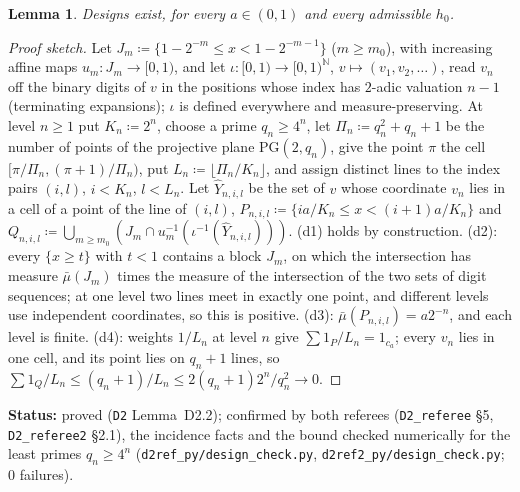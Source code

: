 \documentclass[11pt]{article}
\newtheorem{lemma}[theorem]{Lemma}
\theoremstyle{definition}
\theoremstyle{remark}
\newcommand{\src}[1]{\texttt{#1}}
\newcommand{\status}[1]{\par\smallskip\noindent\textbf{Status:} #1\par\smallskip}
\begin{document}
\begin{lemma}\label{lem:D22}
Designs exist, for every $a\in(0,1)$ and every admissible $h_0$.
\end{lemma}
\begin{proof}[Proof sketch]
Let $J_m\coloneqq\{1-2^{-m}\le x<1-2^{-m-1}\}$ ($m\ge m_0$), with increasing affine maps $u_m:J_m\to[0,1)$, and let $\iota:[0,1)\to[0,1)^{\mathbb N}$, $v\mapsto(v_1,v_2,\dots)$, read $v_n$ off the binary digits of $v$ in the positions whose index has $2$-adic valuation $n-1$ (terminating expansions); $\iota$ is defined everywhere and measure-preserving. At level $n\ge1$ put $K_n\coloneqq2^n$, choose a prime $q_n\ge4^n$, let $\Pi_n\coloneqq q_n^2+q_n+1$ be the number of points of the projective plane $\mathrm{PG}(2,q_n)$, give the point $\pi$ the cell $[\pi/\Pi_n,(\pi+1)/\Pi_n)$, put $L_n\coloneqq\lfloor\Pi_n/K_n\rfloor$, and assign distinct lines to the index pairs $(i,l)$, $i<K_n$, $l<L_n$. Let $\hat Y_{n,i,l}$ be the set of $v$ whose coordinate $v_n$ lies in a cell of a point of the line of $(i,l)$, $P_{n,i,l}\coloneqq\{ia/K_n\le x<(i+1)a/K_n\}$ and $Q_{n,i,l}\coloneqq\bigcup_{m\ge m_0}(J_m\cap u_m^{-1}(\iota^{-1}(\hat Y_{n,i,l})))$. (d1) holds by construction. (d2): every $\{x\ge t\}$ with $t<1$ contains a block $J_m$, on which the intersection has measure $\bar\mu(J_m)$ times the measure of the intersection of the two sets of digit sequences; at one level two lines meet in exactly one point, and different levels use independent coordinates, so this is positive. (d3): $\bar\mu(P_{n,i,l})=a2^{-n}$, and each level is finite. (d4): weights $1/L_n$ at level $n$ give $\sum1_P/L_n=1_{c_a}$; every $v_n$ lies in one cell, and its point lies on $q_n+1$ lines, so $\sum1_Q/L_n\le(q_n+1)/L_n\le2(q_n+1)2^n/q_n^2\to0$.
\end{proof}
\status{proved (\src{D2} Lemma~D2.2); confirmed by both referees (\src{D2\_referee} \S5, \src{D2\_referee2} \S2.1), the incidence facts and the bound checked numerically for the least primes $q_n\ge4^n$ (\src{d2ref\_py/design\_check.py}, \src{d2ref2\_py/design\_check.py}; 0 failures).}
\end{document}
